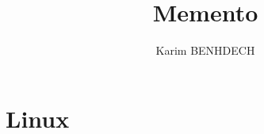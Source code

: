 \documentclass[10pt,a4paper]{article}
\title{Memento}
\author{Karim BENHDECH}
\begin{document}
	\maketitle

    \newpage
	\tableofcontents
	
	\newpage
	\part{Linux}
	
	
\end{document}
